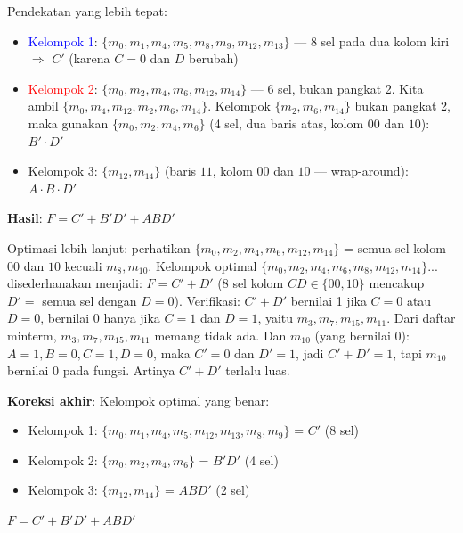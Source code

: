 \begin{contoh}
Pendekatan yang lebih tepat:
\begin{itemize}
    \item \textcolor{blue}{Kelompok 1}: $\{m_0, m_1, m_4, m_5, m_8, m_9, m_{12}, m_{13}\}$ --- 8 sel pada dua kolom kiri $\Rightarrow$ $C' $ (karena $C = 0$ dan $D$ berubah)
    \item \textcolor{red}{Kelompok 2}: $\{m_0, m_2, m_4, m_6, m_{12}, m_{14}\}$ --- 6 sel, bukan pangkat 2. Kita ambil $\{m_0, m_4, m_{12}, m_2, m_6, m_{14}\}$. Kelompok $\{m_2, m_6, m_{14}\}$ bukan pangkat 2, maka gunakan $\{m_0, m_2, m_4, m_6\}$ (4 sel, dua baris atas, kolom $00$ dan $10$): $B' \cdot D'$
    \item \textcolor{green!50!black}{Kelompok 3}: $\{m_{12}, m_{14}\}$ (baris $11$, kolom $00$ dan $10$ --- wrap-around): $A \cdot B \cdot D'$
\end{itemize}

\textbf{Hasil}: $F = C' + B'D' + ABD'$

Optimasi lebih lanjut: perhatikan $\{m_0, m_2, m_4, m_6, m_{12}, m_{14}\}$ = semua sel kolom $00$ dan $10$ kecuali $m_8, m_{10}$. Kelompok optimal $\{m_0, m_2, m_4, m_6, m_8, m_{12}, m_{14}\}$... disederhanakan menjadi: $F = C' + D'$ (8 sel kolom $CD \in \{00, 10\}$ mencakup $D' = $ semua sel dengan $D = 0$). Verifikasi: $C' + D'$ bernilai 1 jika $C = 0$ atau $D = 0$, bernilai 0 hanya jika $C = 1$ dan $D = 1$, yaitu $m_3, m_7, m_{15}, m_{11}$.  Dari daftar minterm, $m_3, m_7, m_{15}, m_{11}$ memang tidak ada. Dan $m_{10}$ (yang bernilai 0): $A=1, B=0, C=1, D=0$, maka $C'=0$ dan $D'=1$, jadi $C'+D' = 1$, tapi $m_{10}$ bernilai 0 pada fungsi. Artinya $C' + D'$ terlalu luas.

\textbf{Koreksi akhir}: Kelompok optimal yang benar:
\begin{itemize}
    \item Kelompok 1: $\{m_0,m_1,m_4,m_5,m_{12},m_{13},m_8,m_9\}$ = $C'$ (8 sel)
    \item Kelompok 2: $\{m_0,m_2,m_4,m_6\}$ = $B'D'$ (4 sel)  
    \item Kelompok 3: $\{m_{12},m_{14}\}$ = $ABD'$ (2 sel)
\end{itemize}

$F = C' + B'D' + ABD'$
\end{contoh}

